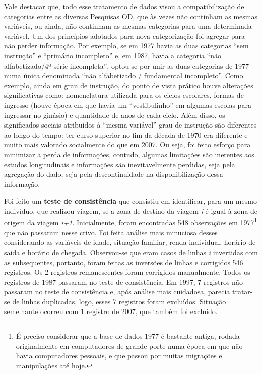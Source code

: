 \newpage
Vale destacar que, todo esse tratamento de dados visou a compatibilização de categorias entre as diversas Pesquisas OD, que às vezes não continham as mesmas variáveis, ou ainda, não continham as mesmas categorias para uma determinada variável.
Um dos princípios adotados para nova categorização foi agregar para não perder informação. 
Por exemplo, se em 1977 havia as duas categorias ``sem instrução'' e ``primário incompleto'' e, em 1987, havia a categoria ``não alfabetizado/4ª série incompleta'', optou-se por unir as duas categorias de 1977 numa única denominada ``não alfabetizado / fundamental incompleto''. 
Como exemplo, ainda em grau de instrução, do ponto de vista prático houve alterações significativas como: nomenclatura utilizada para os ciclos escolares, formas de ingresso (houve época em que havia um ``vestibulinho'' em algumas escolas para ingressar no ginásio) e quantidade de anos de cada ciclo. 
Além disso, os significados sociais atribuídos à ``mesma variável'' grau de instrução são diferentes ao longo do tempo: ter curso superior no fim da década de 1970 era diferente e muito mais valorado socialmente do que em 2007.
Ou seja, foi feito esforço para minimizar a perda de informações, contudo, algumas limitações são inerentes aos estudos longitudinais e informações são inevitavelmente perdidas, seja pela agregação do dado, seja pela descontinuidade na disponibilização dessa informação.

Foi feito um \textbf{teste de consistência} que consistiu em identificar, para um mesmo indivíduo, que realizou viagem, se a zona de destino da viagem \textit{i} é igual à zona de origem da viagem \textit{i+1}. Inicialmente, foram encontradas 548 observações em 1977\footnote{É preciso considerar que a base de dados 1977 é bastante antiga, rodada originalmente em computadores de grande porte numa época em que não havia computadores pessoais, e que passou por muitas migrações e manipulações até hoje.} que não passaram nesse crivo.  Foi feita análise mais minuciosa desses considerando as variáveis de idade, situação familiar, renda individual, horário de saída e horário de chegada. Observou-se que eram casos de linhas \textit{i} invertidas com as subsequentes, portanto, foram feitas as inversões de linhas e corrigidos 546 registros. Os 2 registros remanescentes foram corrigidos manualmente. Todos os registros de 1987 passaram no teste de consistência. Em 1997, 7 registros não passaram no teste de consistência e, após análise mais cuidadosa, parecia tratar-se de linhas duplicadas, logo, esses 7 registros foram excluídos. Situação semelhante ocorreu com 1 registro de 2007, que também foi excluído.

